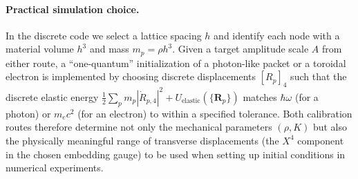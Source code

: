 \paragraph{Practical simulation choice.}

In the discrete code we select a lattice spacing $h$ and identify each node with
a material volume $h^3$ and mass $m_p = \rho h^3$. Given a target amplitude
scale $A$ from either route, a ``one-quantum'' initialization of a photon-like
packet or a toroidal electron is implemented by choosing discrete displacements
$[R_p]_4$ such that the discrete elastic energy
$\tfrac{1}{2}\sum_p m_p |\dot{R}_{p,4}|^2 + U_{\text{elastic}}(\{\mathbf R_p\})$
matches $\hbar\omega$ (for a photon) or $m_e c^2$ (for an electron) to within a
specified tolerance. Both calibration routes therefore determine not only the
mechanical parameters $(\rho,K)$ but also the physically meaningful range of
transverse displacements (the $X^4$ component in the chosen embedding gauge) to be used when setting up initial conditions in
numerical experiments.

